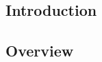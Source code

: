 \documentclass[
    a4paper, %
	fontsize=10pt, %
	twoside=false, %
]{kaobook}
\begin{document}
\begin{titlepage}
\let\cleardoublepage\bigskip
\let\clearpage\bigskip


\endgroup


\mainmatter %


\renewcommand{\marginlayout}{%
 \newgeometry{
	top=27.4mm,
	bottom=27.4mm,
	inner=24.8mm,
	textwidth=127mm, %
	marginparsep=5.2mm,
	marginparwidth=39.4mm 
 }%
}



\chapter{Introduction}


\section{Overview}





\end{titlepage}
\end{document}
